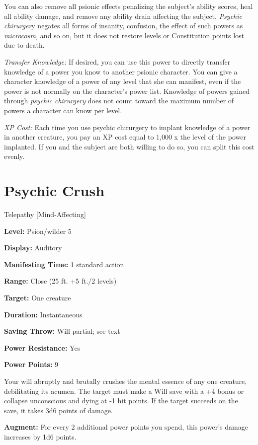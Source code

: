\documentclass{article}
\begin{document}
You can also remove all psionic effects penalizing the subject's ability scores, 
heal all ability damage, and remove any ability drain affecting the subject. \textit{Psychic 
chirurger}y negates all forms of insanity, confusion, the effect of such powers 
as \textit{microcosm, }and so on, but it does not restore levels or Constitution 
points lost due to death.

\textit{Transfer Knowledge: }If desired, you can use this power to directly transfer 
knowledge of a power you know to another psionic character. You can give a character 
knowledge of a power of any level that she can manifest, even if the power is not 
normally on the character's power list. Knowledge of powers gained through \textit{psychic 
chirurgery }does not count toward the maximum number of powers a character can 
know per level.

\textit{XP Cost: }Each time you use psychic chirurgery to implant knowledge of 
a power in another creature, you pay an XP cost equal to 1,000 x the level of the 
power implanted. If you and the subject are both willing to do so, you can split 
this cost evenly.

\vspace{12pt}
\section*{Psychic Crush}

Telepathy [Mind-Affecting]

\textbf{Level:} Psion/wilder 5

\textbf{Display:} Auditory

\textbf{Manifesting Time:} 1 standard action

\textbf{Range:} Close (25 ft. +5 ft./2 levels)

\textbf{Target:} One creature

\textbf{Duration:} Instantaneous

\textbf{Saving Throw:} Will partial; see text

\textbf{Power Resistance:} Yes

\textbf{Power Points:} 9

Your will abruptly and brutally crushes the mental essence of any one creature, 
debilitating its acumen. The target must make a Will save with a +4 bonus or collapse 
unconscious and dying at -1 hit points. If the target succeeds on the save, it 
takes 3d6 points of damage.

\textbf{Augment:} For every 2 additional power points you spend, this power's damage 
increases by 1d6 points. 
\end{document}
